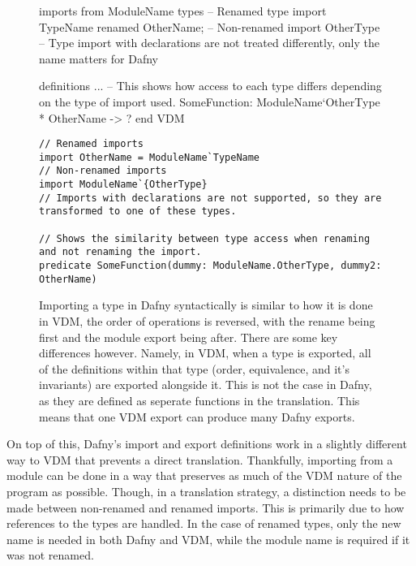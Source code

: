 \documentclass{entcs}
\begin{document}
\begin{figure}[h]
	\begin{center}
        \begin{vdmsl}

imports from ModuleName 
    types 
        -- Renamed type import 
        TypeName renamed OtherName;
        -- Non-renamed import 
        OtherType
        -- Type import with declarations are not treated differently, only the name matters for Dafny

definitions
...
-- This shows how access to each type differs depending on the type of import used.
SomeFunction: ModuleName`OtherType * OtherName -> ?
end VDM

        
        \end{vdmsl}
        \begin{lstlisting}
// Renamed imports
import OtherName = ModuleName`TypeName
// Non-renamed imports
import ModuleName`{OtherType}
// Imports with declarations are not supported, so they are transformed to one of these types.

// Shows the similarity between type access when renaming and not renaming the import.
predicate SomeFunction(dummy: ModuleName.OtherType, dummy2: OtherName)
        \end{lstlisting}
		\caption{Importing a type in Dafny syntactically is similar to how it is done in VDM, the order of operations is reversed, with the rename being first and the module export being after. There are some key differences however. Namely, in VDM, when a type is exported, all of the definitions within that type (order, equivalence, and it's invariants) are exported alongside it. This is not the case in Dafny, as they are defined as seperate functions in the translation. This means that one VDM export can produce many Dafny exports.}\label{fig:dafny_imports}
	\end{center}
\end{figure}

On top of this, Dafny's import and export definitions work in a slightly different way to VDM that prevents a direct translation. Thankfully, importing from a module can be done in a way that preserves as much of the VDM nature of the program as possible. Though, in a translation strategy, a distinction needs to be made between non-renamed and renamed imports. This is primarily due to how references to the types are handled. In the case of renamed types, only the new name is needed in both Dafny and VDM, while the module name is required if it was not renamed. 
\end{document}
